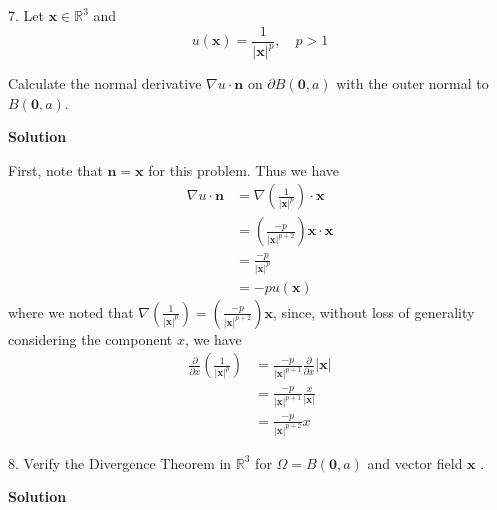 \documentclass{article}
\begin{document}
\vspace{5mm}
7. Let $\mathbf{x} \in \mathbb{R}^{3}$ and
$$u(\mathbf{x}) = \frac{1}{|\mathbf{x}|^{p}}, \quad p>1$$

Calculate the normal derivative $\nabla u \cdot \mathbf{n}$ on $\partial
B(\mathbf{0}, a)$ with the outer normal to $B(\mathbf{0}, a)$.

\textbf{Solution}

First, note that $\mathbf{n} = \mathbf{x}$ for this problem. Thus we
have
%
\begin{align*}
    \nabla u \cdot \mathbf{n}
        &= \nabla \left(\frac{1}{|\mathbf{x}|^{p}} \right) \cdot \mathbf{x} \\
        &= \left(\frac{-p}{|\mathbf{x}|^{p + 2}} \right) \mathbf{x} \cdot \mathbf{x} \\
        &= \frac{-p}{|\mathbf{x}|^{p}} \\
        &= -p u(\mathbf{x})
\end{align*}
%
where we noted that
%
$\nabla \left(\frac{1}{|\mathbf{x}|^{p}} \right) = \left(\frac{-p}{|\mathbf{x}|^{p + 2}} \right) \mathbf{x}$,
since, without loss of generality considering the component $x$, we have
%
\begin{align*}
    \frac{\partial}{\partial x} \left(\frac{1}{|\mathbf{x}|^{p}} \right)
        &= \frac{-p}{|\mathbf{x}|^{p + 1}} \frac{\partial}{\partial x} |\mathbf{x}| \\
        &= \frac{-p}{|\mathbf{x}|^{p + 1}} \frac{x}{|\mathbf{x}|} \\
        &= \frac{-p}{|\mathbf{x}|^{p + 2}} x
\end{align*}

\vspace{5mm}
8. Verify the Divergence Theorem in $\mathbb{R}^{3}$ for
$\Omega = B(\mathbf{0}, a)$ and vector field $\mathbf{x}$ .

\textbf{Solution}
\end{document}
